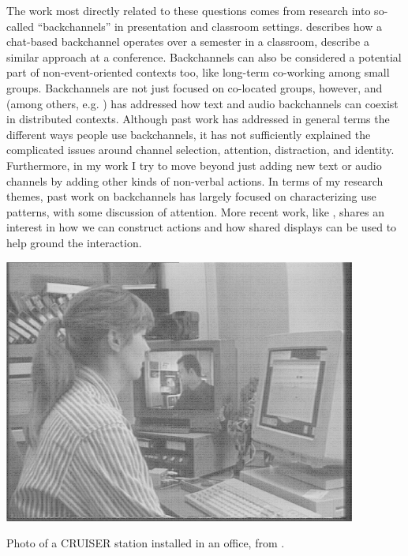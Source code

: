 \documentclass{tufte-handout}
\begin{document}
The work most directly related to these questions comes from research into so-called ``backchannels'' in presentation and classroom settings. \citet{Yardi:2006uk} describes how a chat-based backchannel operates over a semester in a classroom, \citet{mccarthy_digital_2004} describe a similar approach at a conference. Backchannels can also be considered a potential part of non-event-oriented contexts too, like long-term co-working among small groups. \citep{Huang:2003ef} Backchannels are not just focused on co-located groups, however, and \citet{kellogg_leveraging_2006} (among others, e.g.  \citep{Yankelovich:2005bx}) has addressed how text and audio backchannels can coexist in distributed contexts. Although past work has addressed in general terms the different ways people use backchannels, it has not sufficiently explained the complicated issues around channel selection, attention, distraction, and identity. Furthermore, in my work I try to move beyond just adding new text or audio channels by adding other kinds of non-verbal actions. In terms of my research themes, past work on backchannels has largely focused on characterizing use patterns, with some discussion of attention. More recent work, like \citep{Bergstrom:wl}, shares an interest in how we can construct actions and how shared displays can be used to help ground the interaction.

\begin{marginfigure}
	\includegraphics{figures/CRUISER.png}
	\caption{Photo of a CRUISER station installed in an office, from \citep{Fish:1992vz}.}
	\label{fig:cruiser}
\end{marginfigure}
\end{document}
